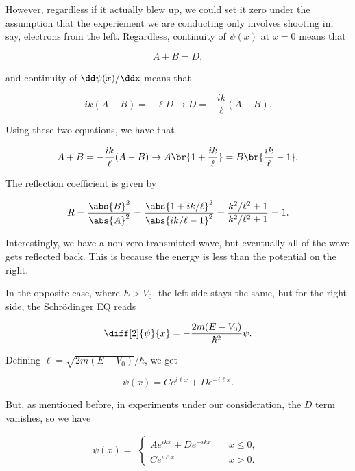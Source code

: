 \begin{parts}
However, regardless if it actually blew up, we could set it zero under the assumption that the experiement we are conducting only involves shooting in, say, electrons from the left. Regardless, continuity of $\psi(x)$ at $x=0$ means that

\begin{equation}
    A+B=D,
\end{equation}

and continuity of $\dd\psi(x)/\ddx$ means that

\begin{equation*}
    ik(A-B) = -\ell D \rightarrow D = -\frac{ik}{\ell}(A-B).
\end{equation*}

Using these two equations, we have that

\begin{equation*}
    A+B = -\frac{ik}{\ell}(A-B) \rightarrow A\br{1 + \frac{ik}{\ell}} = B\br{\frac{ik}{\ell} - 1}.
\end{equation*}

The reflection coefficient is given by 

\begin{equation}
    R = \frac{\abs{B}^2}{\abs{A}^2} = \frac{\abs{1+ik/\ell}^2}{\abs{ik/\ell - 1}^2} = \frac{k^2/\ell^2 + 1}{k^2/\ell^2 + 1} = 1.
\end{equation}

Interestingly, we have a non-zero transmitted wave, but eventually all of the wave gets reflected back. This is because the energy is less than the potential on the right.





\item In the opposite case, where $E>V_0$, the left-side stays the same, but for the right side, the Schr\"odinger EQ reads

\begin{equation*}
    \diff[2]{\psi}{x} = -\frac{2m(E-V_0)}{\hbar^2}\psi.
\end{equation*}

Defining $\ell = \sqrt{2m(E-V_0)}/\hbar$, we get

\begin{equation*}
    \psi(x) = Ce^{i\ell x} + De^{-i\ell x}.
\end{equation*}

But, as mentioned before, in experiments under our consideration, the $D$ term vanishes, so we have

\begin{equation}
    \psi(x) = 
        \begin{alignedat}{1}
        \begin{cases}
            Ae^{ikx} + De^{-ikx} \quad & x\leq0, \\
            Ce^{i\ell x} & x>0.
        \end{cases}
        \end{alignedat}
\end{equation}


\end{parts}
